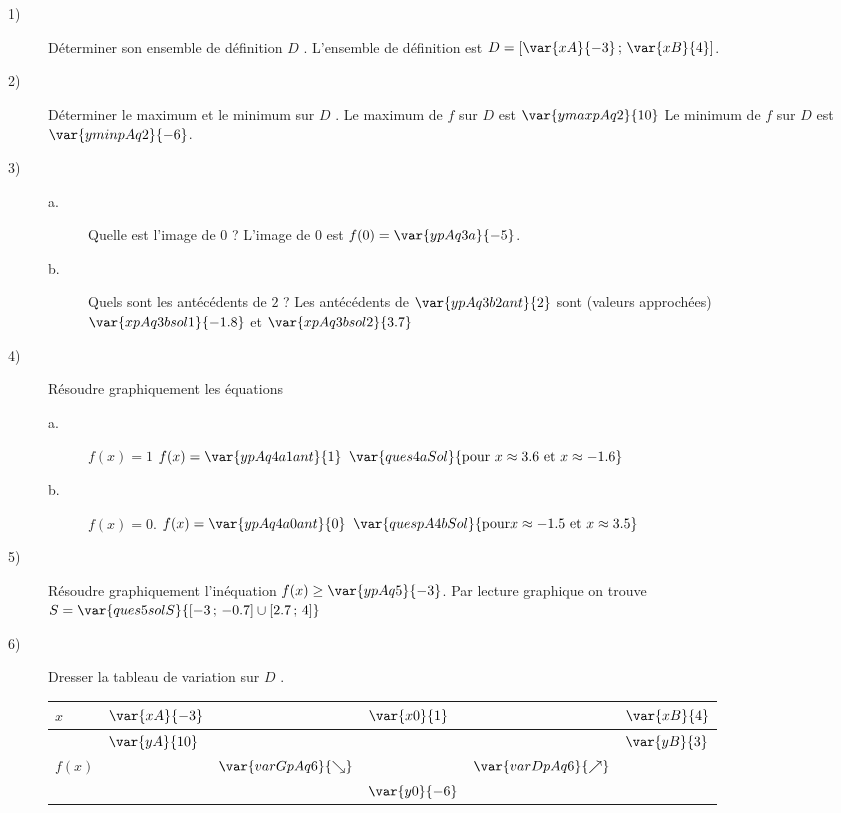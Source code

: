 \begin{description}
\item[1)] 
Déterminer son ensemble de définition $D$ .
L'ensemble de définition est $D = [\var{xA}{-3}\,;\,\var{xB}{4}]$.  %
\item[2)] 
Déterminer le maximum et le minimum sur $D$ .
Le maximum de $f$ sur $D$ est $\var{ymaxpAq2}{10}$  %
Le minimum de $f$ sur $D$ est $\var{yminpAq2}{-6}$.   %
\item[3)]  
\begin{description}
 \item [a.] 
Quelle est l'image de $0$ ?
 L'image de $0$ est $f(0)=\var{ypAq3a}{-5}$.  %
 \item[b.] 
Quels sont les antécédents de $2$ ?
 Les antécédents de $\var{ypAq3b2ant}{2}$ sont (valeurs approchées) $\var{xpAq3bsol1}{-1.8}$ et $\var{xpAq3bsol2}{3.7}$  %
\end{description}

\item[4)] 
Résoudre graphiquement les équations 
\begin{description}
\item[a.] 
$f(x) = 1$
$f(x) = \var{ypAq4a1ant}{1}$  $\var{ques4aSol}{\mbox{pour }x\approx 3.6\mbox{ et }x\approx -1.6}$  %
\item[b.] 
$f(x) = 0$.
$f(x) = \var{ypAq4a0ant}{0}$ $\var{quespA4bSol}{\mbox{pour}x\approx -1.5\mbox{ et }x\approx 3.5}$  %
\end{description}

\item[5)]  
Résoudre graphiquement l'inéquation $f(x)\geq \var{ypAq5}{-3}$.
Par lecture graphique on trouve $S =\var{ques5solS}{ [-3\,;\,-0.7] \cup  [2.7\,;\,4]}$  %
\item[6)] 
Dresser la tableau de variation sur $D$ .
\begin{center}
\begin{tabular}{|l|lllll|} \hline
$x$ & $\var{xA}{-3}$ &  & $\var{x0}{1}$ &  & $\var{xB}{4}$\\ \hline
 & $\var{yA}{10}$ &  &  &  & $\var{yB}{3}$\\ 
$f(x)$ &  & $\var{varGpAq6}{\searrow}$ &  & $\var{varDpAq6}{\nearrow}$ & \\
 &  &  & $\var{y0}{-6}$ &  & \\ \hline
\end{tabular}
\end{center}
\end{description}


